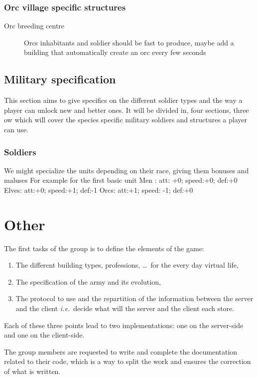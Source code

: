 \documentclass{article}
\def\ie{\textit{i.e.}}
\begin{document}
\subsubsection{Orc village specific structures}
\begin{description}
    \item[Orc breeding centre] Orcs inhabitants and soldier should be fast to produce, maybe add a building that automatically create an orc every few seconds
\end{description}

\subsection{Military specification}
This section aims to give specifics on the different soldier types and the way a player can
unlock new and better ones. It will be divided in, four sections, three ow which will cover the
species specific military soldiers and structures a player can use.

\subsubsection{Soldiers}
We might specialize the units depending on their race, giving them bonuses and maluses
For example for the first basic unit
Men : att: +0; speed:+0; def:+0
Elves: att:+0; speed:+1; def:-1
Orcs: att:+1; speed: -1; def:+0

\section{Other}
The first tasks of the group is to define the elements of the game:
\begin{enumerate}
	\item The different building types, professions, \dots~for the every day
	virtual life,
	\item The specification of the army and its evolution,
	\item The protocol to use and the repartition of the information between the
	server and the client \ie~decide what will the server and the client each
	store.
\end{enumerate}

Each of these three points lead to two implementations: one on the server-side
and one on the client-side.
\smallskip

The group members are requested to write and complete the documentation related
to their code, which is a way to split the work and ensures the correction of
what is written.
\end{document}
